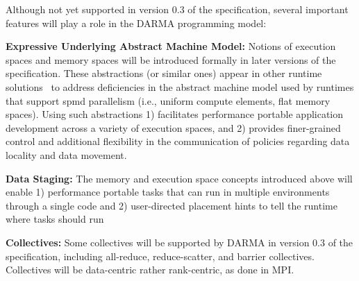 Although not yet supported in version 0.3 of the specification, several
important features will play a role in the DARMA programming model:
\begin{compactdesc}
\item{\bf Expressive Underlying Abstract Machine Model:}
Notions of \glspl{execution space} and \glspl{memory space} will be introduced formally in later versions of the specification.  
These abstractions (or similar ones) appear in other runtime solutions~\cite{kokkos, others}  to address deficiencies in the abstract machine model used by runtimes that support \gls{spmd} parallelism 
(i.e., uniform compute elements, flat memory spaces).  Using such abstractions
1) facilitates performance portable application development across 
a variety of execution spaces, and 2)
  provides finer-grained control and additional flexibility in the
  communication of policies regarding data locality and data movement. 
\item {\bf Data Staging:}
The memory and execution space concepts introduced above will enable 1) performance portable tasks that can run in multiple environments through a single code and 2) 
user-directed placement hints to tell the runtime where tasks should run
\item {\bf Collectives:}
Some collectives will be supported by DARMA in version 0.3 of the specification, including all-reduce, reduce-scatter, and barrier collectives.
Collectives will be data-centric rather rank-centric, as done in MPI.
\end{compactdesc}
